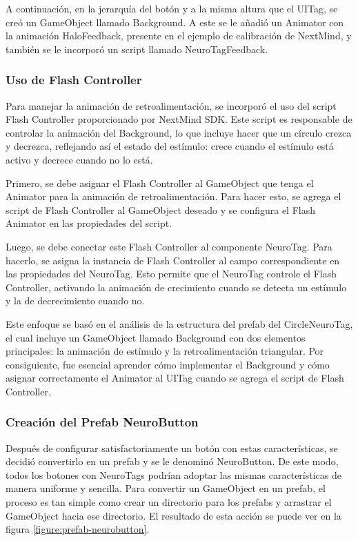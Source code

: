 A continuación, en la jerarquía del botón y a la misma altura que el UITag, se creó un GameObject llamado Background. A este se le añadió un Animator con la animación HaloFeedback, presente en el ejemplo de calibración de NextMind, y también se le incorporó un script llamado NeuroTagFeedback.

\subsubsection{Uso de Flash Controller}

Para manejar la animación de retroalimentación, se incorporó el uso del script Flash Controller proporcionado por NextMind SDK. Este script es responsable de controlar la animación del Background, lo que incluye hacer que un círculo crezca y decrezca, reflejando así el estado del estímulo: crece cuando el estímulo está activo y decrece cuando no lo está.



Primero, se debe asignar el Flash Controller al GameObject que tenga el Animator para la animación de retroalimentación. Para hacer esto, se agrega el script de Flash Controller al GameObject deseado y se configura el Flash Animator en las propiedades del script.



Luego, se debe conectar este Flash Controller al componente NeuroTag. Para hacerlo, se asigna la instancia de Flash Controller al campo correspondiente en las propiedades del NeuroTag. Esto permite que el NeuroTag controle el Flash Controller, activando la animación de crecimiento cuando se detecta un estímulo y la de decrecimiento cuando no.



Este enfoque se basó en el análisis de la estructura del prefab del CircleNeuroTag, el cual incluye un GameObject llamado Background con dos elementos principales: la animación de estímulo y la retroalimentación triangular. Por consiguiente, fue esencial aprender cómo implementar el Background y cómo asignar correctamente el Animator al UITag cuando se agrega el script de Flash Controller.

\subsubsection{Creación del Prefab NeuroButton}

Después de configurar satisfactoriamente un botón con estas características, se decidió convertirlo en un prefab y se le denominó NeuroButton. De este modo, todos los botones con NeuroTags podrían adoptar las mismas características de manera uniforme y sencilla. Para convertir un GameObject en un prefab, el proceso es tan simple como crear un directorio para los prefabs y arrastrar el GameObject hacia ese directorio. El resultado de esta acción se puede ver en la figura \ref{figure:prefab-neurobutton}.

